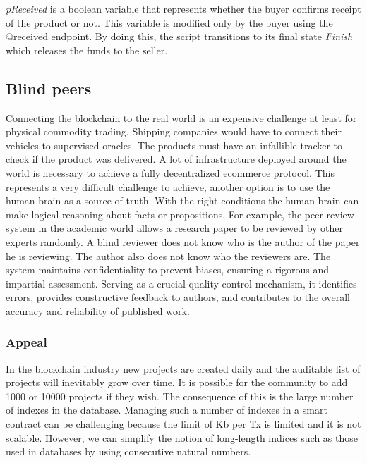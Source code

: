 \documentclass[12pt]{article}
\begin{document}
\emph{pReceived} is a boolean variable that represents whether the buyer confirms receipt of the product or not. This variable is modified only by the buyer using the @received endpoint.
By doing this, the script transitions to its final state \emph{Finish} which releases the funds to the seller.
 
 
\subsection { Blind peers }  

Connecting the blockchain to the real world is an expensive challenge at least for physical commodity trading.
Shipping companies would have to connect their vehicles to supervised oracles.
The products must have an infallible tracker to check if the product was delivered.
A lot of infrastructure deployed around the world is necessary to achieve a fully decentralized ecommerce protocol. This represents a very difficult challenge to achieve, another option is to use the human brain as a source of truth.
With the right conditions the human brain can make logical reasoning about facts or propositions.
For example, the peer review system in the academic world allows a research paper to be reviewed by other experts randomly. A blind reviewer does not know who is the author of the paper he is reviewing. The author also does not know who the reviewers are.
The system maintains confidentiality to prevent biases, ensuring a rigorous and impartial assessment. Serving as a crucial quality control mechanism, it identifies errors, provides constructive feedback to authors, and contributes to the overall accuracy and reliability of published work. 


\subsubsection { Appeal } 








In the blockchain industry new projects are created daily and the auditable list of projects will inevitably grow over time. It is possible for the community to add 1000 or 10000 projects if they wish. The consequence of this is the large number of indexes in the database. Managing such a number of indexes in a smart contract can be challenging because the limit of Kb per Tx is limited and it is not scalable. However, we can simplify the notion of long-length indices such as those used in databases by using consecutive natural numbers.
\end{document}
